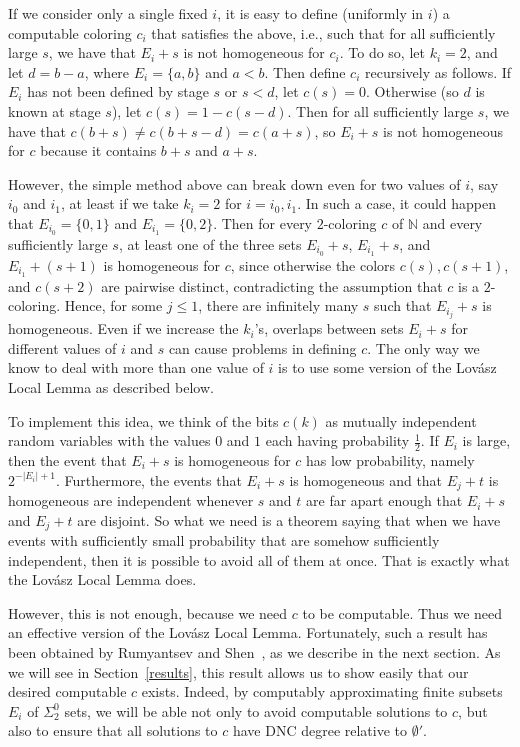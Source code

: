 \documentclass{amsart}
\theoremstyle{definition}
\renewcommand{\leq}{\leqslant}
\begin{document}
If we consider only a single fixed $i$, it is easy to define
(uniformly in $i$) a computable coloring $c_i$ that satisfies the
above, i.e., such that for all sufficiently large $s$, we have that
$E_i + s$ is not homogeneous for $c_i$. To do so, let $k_i = 2$, and
let $d = b - a$, where $E_i = \{a, b\}$ and $a < b$. Then define
$c_i$ recursively as follows. If $E_i$ has not been defined by stage
$s$ or $s < d$, let $c(s) = 0$. Otherwise (so $d$ is known at stage
$s$), let $c(s) = 1 - c(s - d)$. Then for all sufficiently large $s$,
we have that $c(b + s) \neq c(b + s - d) = c(a + s)$, so $E_i + s$ is
not homogeneous for $c$ because it contains $b + s$ and $a + s$.

However, the simple method above can break down even for two values of
$i$, say $i_0$ and $i_1$, at least if we take $k_i = 2$ for $i = i_0,
i_1$. In such a case, it could happen that $E_{i_0} = \{0,1\}$ and
$E_{i_1} = \{0,2\}$. Then for every $2$-coloring $c$ of $\mathbb{N}$
and every sufficiently large $s$, at least one of the three sets
$E_{i_0} + s$, $E_{i_1} + s$, and $E_{i_1} + (s+1)$ is homogeneous for
$c$, since otherwise the colors $c(s), c(s+1)$, and $c(s+2)$ are
pairwise distinct, contradicting the assumption that $c$ is a
$2$-coloring. Hence, for some $j \leq 1$, there are infinitely many
$s$ such that $E_{i_j} + s$ is homogeneous. Even if we increase the
$k_i$'s, overlaps between sets $E_i+s$ for different values of $i$ and
$s$ can cause problems in defining $c$. The only way we know to deal
with more than one value of $i$ is to use some version of the
Lov{\'a}sz Local Lemma as described below.

To implement this idea, we think of the bits $c(k)$ as mutually
independent random variables with the values $0$ and $1$ each having
probability $\frac{1}{2}$. If $E_i$ is large, then the event that $E_i
+ s$ is homogeneous for $c$ has low probability, namely $2^{-|E_i| +
 1}$. Furthermore, the events that $E_i + s$ is homogeneous and that
$E_j + t$ is homogeneous are independent whenever $s$ and $t$ are far
apart enough that $E_i + s$ and $E_j + t$ are disjoint. So what we
need is a theorem saying that when we have events with sufficiently
small probability that are somehow sufficiently independent, then it
is possible to avoid all of them at once. That is exactly what the
Lov{\'a}sz Local Lemma does.

However, this is not enough, because we need $c$ to be
computable. Thus we need an effective version of the Lov{\'a}sz Local
Lemma. Fortunately, such a result has been obtained by Rumyantsev and
Shen~\cite{R,RS}, as we describe in the next section. As we will see in
Section~\ref{results}, this result allows us to show easily that our
desired computable $c$ exists. Indeed, by computably approximating
finite subsets $E_i$ of $\Sigma^0_2$ sets, we will be able not only to
avoid computable solutions to $c$, but also to ensure that all
solutions to $c$ have DNC degree relative to $\emptyset'$.
\end{document}

